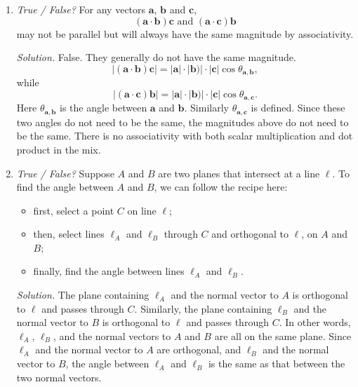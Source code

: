 \documentclass{article}
\begin{document}
\begin{enumerate}
\item {\em True / False?} For any vectors $\mathbf{a}$, $\mathbf{b}$ and $\mathbf{c}$,
\[
(\mathbf{a} \cdot \mathbf{b}) \mathbf{c} \text{ and } (\mathbf{a} \cdot \mathbf{c}) \mathbf{b}
\]
may not be parallel but will always have the same magnitude by associativity.

{\em Solution.} False. They generally do not have the same magnitude.
\[
|(\mathbf{a} \cdot \mathbf{b}) \mathbf{c}| = |\mathbf{a}| \cdot |\mathbf{b})| \cdot |\mathbf{c}| \cos \theta_{\mathbf{a}, \mathbf{b}},
\]
while
\[
|(\mathbf{a} \cdot \mathbf{c}) \mathbf{b}| = |\mathbf{a}| \cdot |\mathbf{b})| \cdot |\mathbf{c}| \cos \theta_{\mathbf{a}, \mathbf{c}}.
\]
Here $\theta_{\mathbf{a}, \mathbf{b}}$ is the angle between $\mathbf{a}$ and $\mathbf{b}$. Similarly $\theta_{\mathbf{a}, \mathbf{c}}$ is defined. Since these two angles do not need to be the same, the magnitudes above do not need to be the same. There is no associativity with both scalar multiplication and dot product in the mix.

\item {\em True / False?} Suppose $A$ and $B$ are two planes that intersect at a line $\ell$. To find the angle between $A$ and $B$, we can follow the recipe here:
\begin{itemize}
\item first, select a point $C$ on line $\ell$;
\item then, select lines $\ell_A$ and $\ell_B$ through $C$ and orthogonal to $\ell$, on $A$ and $B$;
\item finally, find the angle between lines $\ell_A$ and $\ell_B$.
\end{itemize}

{\em Solution.} The plane containing $\ell_A$ and the normal vector to $A$ is orthogonal to $\ell$ and passes through $C$. Similarly, the plane containing $\ell_B$ and the normal vector to $B$ is orthogonal to $\ell$ and passes through $C$. In other words, $\ell_A$, $\ell_B$, and the normal vectors to $A$ and $B$ are all on the same plane. Since $\ell_A$ and the normal vector to $A$ are orthogonal, and $\ell_B$ and the normal vector to $B$, the angle between $\ell_A$ and $\ell_B$ is the same as that between the two normal vectors.
\end{enumerate}
\end{document}
